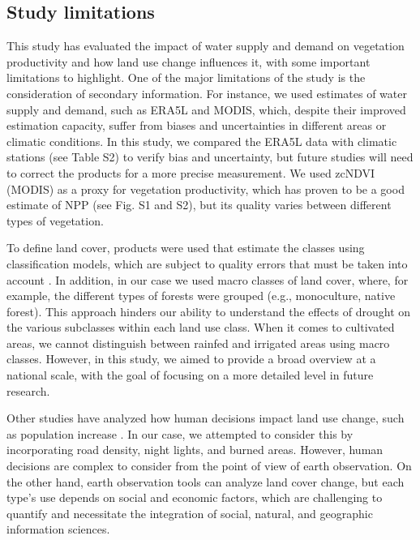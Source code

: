 \documentclass[
  sn-nature,
  numbered]{sn-jnl}
\begin{document}
\subsection{Study limitations}\label{study-limitations}

This study has evaluated the impact of water supply and demand on
vegetation productivity and how land use change influences it, with some
important limitations to highlight. One of the major limitations of the
study is the consideration of secondary information. For instance, we
used estimates of water supply and demand, such as ERA5L and MODIS,
which, despite their improved estimation capacity, suffer from biases
and uncertainties \citep{Gomis2023, Clelland2024} in different areas or
climatic conditions. In this study, we compared the ERA5L data with
climatic stations (see Table S2) to verify bias and uncertainty, but
future studies will need to correct the products for a more precise
measurement. We used zcNDVI \citep{Zambrano2018} (MODIS) as a proxy for
vegetation productivity, which has proven to be a good estimate of NPP
(see Fig. S1 and S2), but its quality varies between different types of
vegetation.

To define land cover, products were used that estimate the classes using
classification models, which are subject to quality errors that must be
taken into account \citep{Stehman2019, Verburg2011}. In addition, in our
case we used macro classes of land cover, where, for example, the
different types of forests were grouped (e.g., monoculture, native
forest). This approach hinders our ability to understand the effects of
drought on the various subclasses within each land use class. When it
comes to cultivated areas, we cannot distinguish between rainfed and
irrigated areas using macro classes. However, in this study, we aimed to
provide a broad overview at a national scale, with the goal of focusing
on a more detailed level in future research.

Other studies have analyzed how human decisions impact land use change,
such as population increase \citep{Kleemann2017}. In our case, we
attempted to consider this by incorporating road density, night lights,
and burned areas. However, human decisions are complex to consider from
the point of view of earth observation. On the other hand, earth
observation tools can analyze land cover change, but each type's use
depends on social and economic factors, which are challenging to
quantify \citep{Rindfuss2004, Jenner2024} and necessitate the
integration of social, natural, and geographic information sciences.
\end{document}
